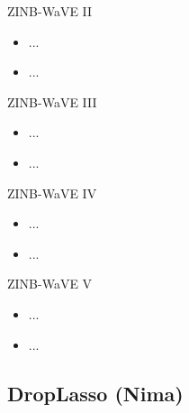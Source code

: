 \documentclass{beamer}
\begin{document}
\begin{frame}{ZINB-WaVE II}

\begin{itemize}
  \itemsep12pt
  \item ...
  \item ...
\end{itemize}

\end{frame}


\begin{frame}{ZINB-WaVE III}

\begin{itemize}
  \itemsep12pt
  \item ...
  \item ...
\end{itemize}

\end{frame}


\begin{frame}{ZINB-WaVE IV}

\begin{itemize}
  \itemsep12pt
  \item ...
  \item ...
\end{itemize}

\end{frame}


\begin{frame}{ZINB-WaVE V}

\begin{itemize}
  \itemsep12pt
  \item ...
  \item ...
\end{itemize}

\end{frame}

\subsection{DropLasso (Nima)}
\end{document}

